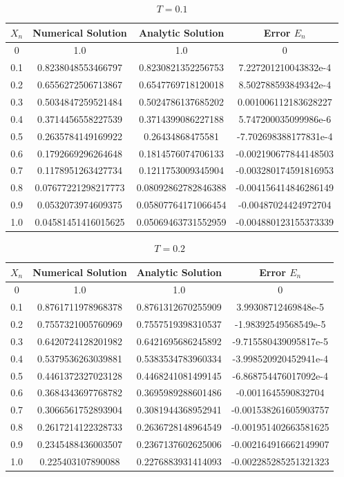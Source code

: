 \documentclass[10pt,a4paper,notitlepage]{article}
\begin{document}
\begin{table}[H]
\centering
\begin{tabular}{|c|c|c|c|}
\hline $X_{n}$ & Numerical Solution & Analytic Solution & Error $E_{n}$ \\ \hline 0 & 1.0 & 1.0 & 0\\ 0.1 & 0.8238048553466797 & 0.8230821352256753 & 7.227201210043832e-4\\ 0.2 & 0.6556272506713867 & 0.6547769718120018 & 8.502788593849342e-4\\ 0.3 & 0.5034847259521484 & 0.5024786137685202 & 0.001006112183628227\\ 0.4 & 0.3714456558227539 & 0.3714399086227188 & 5.747200035099986e-6\\ 0.5 & 0.2635784149169922 & 0.26434868475581 & -7.702698388177831e-4\\ 0.6 & 0.1792669296264648 & 0.1814576074706133 & -0.002190677844148503\\ 0.7 & 0.1178951263427734 & 0.1211753009345904 & -0.003280174591816953\\ 0.8 & 0.07677221298217773 & 0.08092862782846388 & -0.004156414846286149\\ 0.9 & 0.0532073974609375 & 0.05807764171066454 & -0.00487024424972704\\ 1.0 & 0.04581451416015625 & 0.05069463731552959 & -0.004880123155373339\\ \hline \end{tabular}
\caption{$T=0.1$}\label{tb:NumData1}
\end{table}
\begin{table}[H]
\centering 
\begin{tabular}{|c|c|c|c|}\hline $X_{n}$ & Numerical Solution & Analytic Solution & Error $E_{n}$ \\ \hline 0 & 1.0 & 1.0 & 0\\ 0.1 & 0.8761711978968378 & 0.8761312670255909 & 3.99308712469848e-5\\ 0.2 & 0.7557321005760969 & 0.7557519398310537 & -1.98392549568549e-5\\ 0.3 & 0.6420724128201982 & 0.6421695686245892 & -9.715580439095817e-5\\ 0.4 & 0.5379536263039881 & 0.5383534783960334 & -3.998520920452941e-4\\ 0.5 & 0.4461372327023128 & 0.4468241081499145 & -6.868754476017092e-4\\ 0.6 & 0.3684343697768782 & 0.3695989288601486 & -0.0011645590832704\\ 0.7 & 0.3066561752893904 & 0.3081944368952941 & -0.001538261605903757\\ 0.8 & 0.2617214122328733 & 0.2636728148964549 & -0.001951402663581625\\ 0.9 & 0.2345488436003507 & 0.2367137602625006 & -0.002164916662149907\\ 1.0 & 0.225403107890088 & 0.2276883931414093 & -0.002285285251321323
 \\ \hline \end{tabular}
\caption{$T=0.2$}
\end{table}
\end{document}
